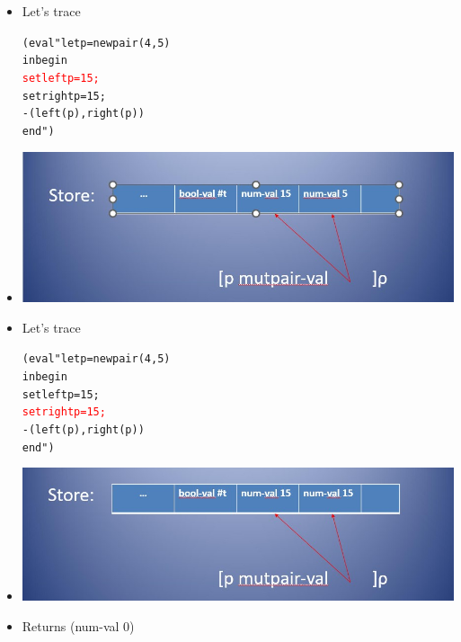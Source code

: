 \documentclass{beamer}
\begin{document}
\begin{frame}[fragile]
\begin{scriptsize}
\begin{itemize}
\item<1-> Let's trace
\begin{alltt}
(eval "let p = newpair(4, 5)
       in begin
            \textcolor{red}{setleft p = 15;}
            setright p = 15;
            -(left(p), right(p))
          end")
\end{alltt}

\item<1->
\begin{center}
\includegraphics[scale=0.5]{mut-pairs2.jpg}
\end{center}

\end{itemize}
\end{scriptsize}
\end{frame}

\begin{frame}[fragile]
\begin{scriptsize}
\begin{itemize}
\item<1-> Let's trace
\begin{alltt}
(eval "let p = newpair(4, 5)
       in begin
            setleft p = 15;
           	\textcolor{red}{setright p = 15;}
           	-(left(p), right(p))
          end")
\end{alltt}

\item<1->
\begin{center}
\includegraphics[scale=0.5]{mut-pairs3.jpg}
\end{center}

\item<1-> Returns (num-val 0)

\end{itemize}
\end{scriptsize}
\end{frame}
\end{document}
